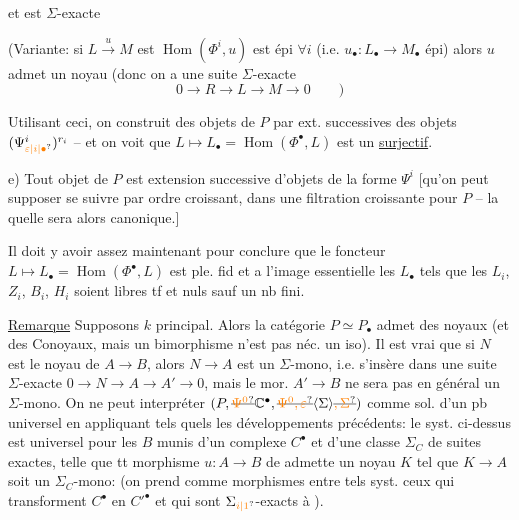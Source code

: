 et est $\Sigma$-exacte

(Variante: si $L\xrightarrow{u}M$ est    $\operatorname{Hom}(\Phi^i,u)$ est épi $\forall i$ (i.e. $u_{\bullet}:L_{\bullet}\longrightarrow M_{\bullet}$ épi) alors $u$  admet un noyau (donc on a une suite $\Sigma$-exacte
\[
0\longrightarrow R\longrightarrow L\longrightarrow M\longrightarrow0\qquad)
\]

Utilisant ceci, on construit des objets de $P$ par ext. successives des objets $(\Psi_{\unsure{\varepsilon|i|\bullet}}^i)^{r_i}$ -- et on voit que $L\longmapsto L_{\bullet}=\operatorname{Hom}(\Phi^{\bullet},L)$ est un \uline{surjectif}.

e) Tout objet  de $P$ est extension successive d'objets de la forme $\Psi^i$ [qu'on peut supposer se suivre par ordre croissant, dans une filtration croissante  pour $P$ -- la quelle sera alors canonique.]

Il doit y avoir assez maintenant pour conclure que le foncteur $L\longmapsto L_{\bullet}=\operatorname{Hom}(\Phi^{\bullet},L)$ est ple. fid et a l'image essentielle les $L_{\bullet}$ tels que les $L_i$, $Z_i$, $B_i$, $H_i$ soient libres tf et  nuls sauf un nb fini.

\uline{Remarque} Supposons $k$ principal. Alors la catégorie $P\simeq P_{\bullet}$  admet des \deleted{$\Sigma$} noyaux (et des Conoyaux,  mais un bimorphisme n'est pas néc. un iso).  Il est  vrai que si $N$ est le noyau de $A\longrightarrow B$, alors $N\longrightarrow A$ est un $\Sigma$-mono, i.e. s'insère dans une suite $\Sigma$-exacte $0\longrightarrow N\longrightarrow A\longrightarrow A'\longrightarrow0$, mais le mor. $A'\longrightarrow B$ ne sera pas en général un $\Sigma$-mono.  On ne peut interpréter $(P,\deleted{\unsure{\Psi^0}}\mathbb{C}^{\bullet},\deleted{\unsure{\Psi^0,\varepsilon}}\inserted{\Sigma}\deleted{\unsure{,\Sigma}})$ comme sol. d'un pb universel en appliquant tels quels les développements précédents:  le syst. ci-dessus est universel pour les $B$  munis d'un complexe  $C^{\bullet}$ et d'une classe $\Sigma_C$ de suites exactes, telle que tt morphisme $u:A\longrightarrow B$ de  admette un noyau $K$ tel que $K\longrightarrow A$ soit un $\Sigma_C$-mono: (on prend comme morphismes entre tels syst. ceux qui transforment $C^{\bullet}$ en $C'^{\bullet}$ et qui sont $\Sigma_{\unsure{i|1}}$-exacts à ).

